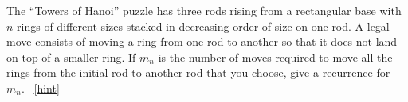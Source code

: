 \documentclass{book}
\begin{document}
\setcounter{project}{137}
\addtocounter{project}{-1}
\begin{activity}[]\label{HanoiProblem}
\hypertarget{p-950}{}%
The ``Towers of Hanoi'' puzzle has three rods rising from a rectangular base with \(n\) rings of different sizes stacked in decreasing order of size on one rod. A legal move consists of moving a ring from one rod to another so that it does not land on top of a smaller ring. If \(m_n\) is the number of moves required to move all the rings from the initial rod to another rod that you choose, give a recurrence for \(m_n\).%
~\hfill{\tiny\hyperlink{a-137}{[hint]}\hypertarget{q-137}{}}\end{activity}
\end{document}
